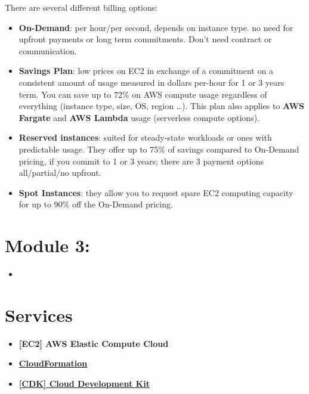 \documentclass{article}
\theoremstyle{definition}
\begin{document}
There are several different billing options:
 \begin{itemize}
 \item \textbf{On-Demand}: per hour/per second, depends on instance type. no need for upfront payments or long term commitments. Don't need contract or communication.
 \item \textbf{Savings Plan}: low prices on EC2 in exchange of a commitment on a consistent amount of usage measured in dollars per-hour for 1 or 3 years term. You can save up to 72\% on AWS compute usage regardless of everything (instance type, size, OS, region \dots). This plan also applies to \textbf{AWS Fargate} and \textbf{AWS Lambda} usage (serverless compute options).
 \item \textbf{Reserved instances}: suited for steady-state workloads or ones with predictable usage. They offer up to 75\% of savings compared to On-Demand pricing, if you commit to 1 or 3 years; there are 3 payment options all/partial/no upfront.
 \item \textbf{Spot Instances}: they allow you to request spare EC2 computing capacity for up to 90\% off the On-Demand pricing. 
 \end{itemize}

\newpage
\section*{Module 3: }
\begin{itemize}
\item 
\end{itemize}



\newpage
\section{Services}
\begin{itemize}
    \item \textbf{[EC2] AWS Elastic Compute Cloud}
    \item \href{https://docs.aws.amazon.com/cloudformation/?id=docs_gateway}{\textbf{CloudFormation}}
    \item \href{https://docs.aws.amazon.com/cdk/?id=docs_gateway}{\textbf{[CDK] Cloud Development Kit}}
\end{itemize}
\end{document}
